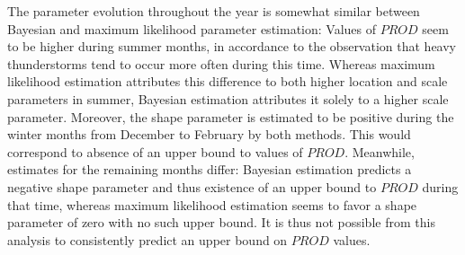 \documentclass[10pt,conference,compsocconf]{IEEEtran}
\begin{document}
The parameter evolution throughout the year is somewhat similar between Bayesian and maximum likelihood parameter estimation: Values of $PROD$ seem to be higher during summer months, in accordance to the observation that heavy thunderstorms tend to occur more often during this time. Whereas maximum likelihood estimation attributes this difference to both higher location and scale parameters in summer, Bayesian estimation attributes it solely to a higher scale parameter. Moreover, the shape parameter is estimated to be positive during the winter months from December to February by both methods. This would correspond to absence of an upper bound to values of $PROD$. Meanwhile, estimates for the remaining months differ: Bayesian estimation predicts a negative shape parameter and thus existence of an upper bound to $PROD$ during that time, whereas maximum likelihood estimation seems to favor a shape parameter of zero with no such upper bound. It is thus not possible from this analysis to consistently predict an upper bound on $PROD$ values. 
\end{document}
